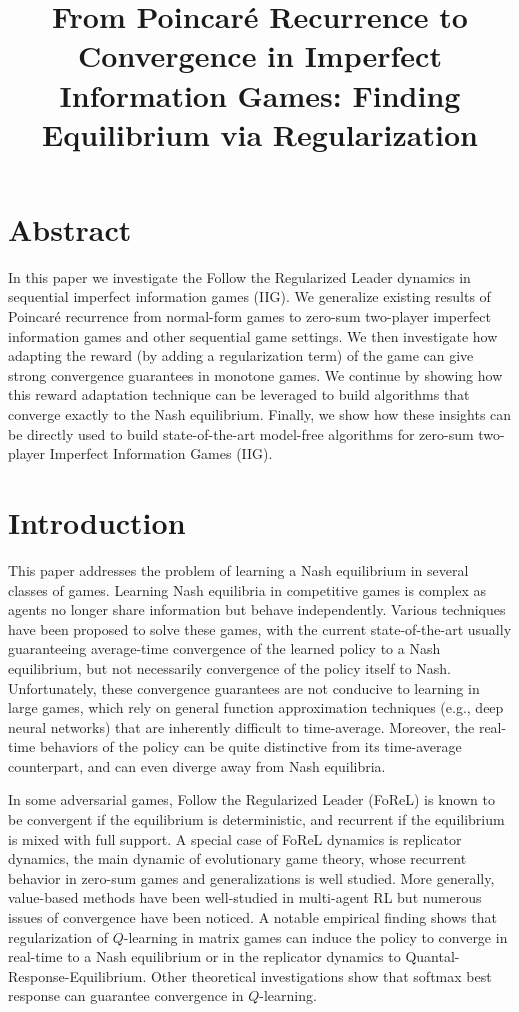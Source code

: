 \title{From Poincar\'e Recurrence to Convergence in Imperfect Information Games: Finding Equilibrium via Regularization}

\section*{Abstract}
In this paper we investigate the Follow the Regularized Leader dynamics in sequential imperfect information games (IIG). We generalize existing results of Poincar\'e recurrence from normal-form games to zero-sum two-player imperfect information games and other sequential game settings. We then investigate how adapting the reward (by adding a regularization term) of the game can give strong convergence guarantees in monotone games. We continue by showing how this reward adaptation technique can be leveraged to build algorithms that converge exactly to the Nash equilibrium. Finally, we show how these insights can be directly used to build state-of-the-art model-free algorithms for zero-sum two-player Imperfect Information Games (IIG).

\section{Introduction}
This paper addresses the problem of learning a Nash equilibrium in several classes of games. Learning Nash equilibria in competitive games is complex as agents no longer share information but behave independently. Various techniques have been proposed to solve these games, with the current state-of-the-art usually guaranteeing average-time convergence of the learned policy to a Nash equilibrium, but not necessarily convergence of the policy itself to Nash. Unfortunately, these convergence guarantees are not conducive to learning in large games, which rely on general function approximation techniques (e.g., deep neural networks) that are inherently difficult to time-average. Moreover, the real-time behaviors of the policy can be quite distinctive from its time-average counterpart, and can even diverge away from Nash equilibria.

In some adversarial games, Follow the Regularized Leader (FoReL) is known to be convergent if the equilibrium is deterministic, and recurrent if the equilibrium is mixed with full support. A special case of FoReL dynamics is replicator dynamics, the main dynamic of evolutionary game theory, whose recurrent behavior in zero-sum games and generalizations is well studied. More generally, value-based methods have been well-studied in multi-agent RL but numerous issues of convergence have been noticed. A notable empirical finding shows that regularization of $Q$-learning in matrix games can induce the policy to converge in real-time to a Nash equilibrium or in the replicator dynamics to Quantal-Response-Equilibrium. Other theoretical investigations show that softmax best response can guarantee convergence in $Q$-learning.

